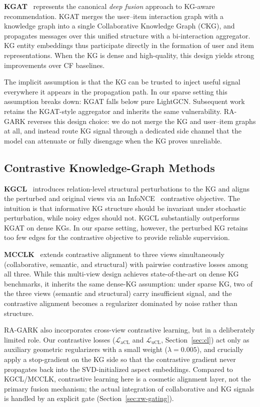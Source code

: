 \textbf{KGAT}~\cite{wang2019kgat} represents the canonical \emph{deep fusion} approach to KG-aware recommendation. KGAT merges the user--item interaction graph with a knowledge graph into a single Collaborative Knowledge Graph (CKG), and propagates messages over this unified structure with a bi-interaction aggregator. KG entity embeddings thus participate directly in the formation of user and item representations. When the KG is dense and high-quality, this design yields strong improvements over CF baselines.

The implicit assumption is that the KG can be trusted to inject useful signal everywhere it appears in the propagation path. In our sparse setting this assumption breaks down: KGAT falls below pure LightGCN. Subsequent work~\cite{yang2022kgcl, zou2022mcclk, yang2023kgrec} retains the KGAT-style aggregator and inherits the same vulnerability. RA-GARK reverses this design choice: we do not merge the KG and user--item graphs at all, and instead route KG signal through a dedicated side channel that the model can attenuate or fully disengage when the KG proves unreliable.

\subsection{Contrastive Knowledge-Graph Methods}
\label{sec:rw-contrastive}

\textbf{KGCL}~\cite{yang2022kgcl} introduces relation-level structural perturbations to the KG and aligns the perturbed and original views via an InfoNCE~\cite{oord2018infonce} contrastive objective. The intuition is that informative KG structure should be invariant under stochastic perturbation, while noisy edges should not. KGCL substantially outperforms KGAT on dense KGs. In our sparse setting, however, the perturbed KG retains too few edges for the contrastive objective to provide reliable supervision.

\textbf{MCCLK}~\cite{zou2022mcclk} extends contrastive alignment to three views simultaneously (collaborative, semantic, and structural) with pairwise contrastive losses among all three. While this multi-view design achieves state-of-the-art on dense KG benchmarks, it inherits the same dense-KG assumption: under sparse KG, two of the three views (semantic and structural) carry insufficient signal, and the contrastive alignment becomes a regularizer dominated by noise rather than structure.

RA-GARK also incorporates cross-view contrastive learning, but in a deliberately limited role. Our contrastive losses ($\mathcal{L}_{\mathrm{aCL}}$ and $\mathcal{L}_{\mathrm{uCL}}$, Section~\ref{sec:cl}) act only as auxiliary geometric regularizers with a small weight ($\lambda = 0.005$), and crucially apply a stop-gradient on the KG side so that the contrastive gradient never propagates back into the SVD-initialized aspect embeddings. Compared to KGCL/MCCLK, contrastive learning here is a cosmetic alignment layer, not the primary fusion mechanism; the actual integration of collaborative and KG signals is handled by an explicit gate (Section~\ref{sec:rw-gating}).

